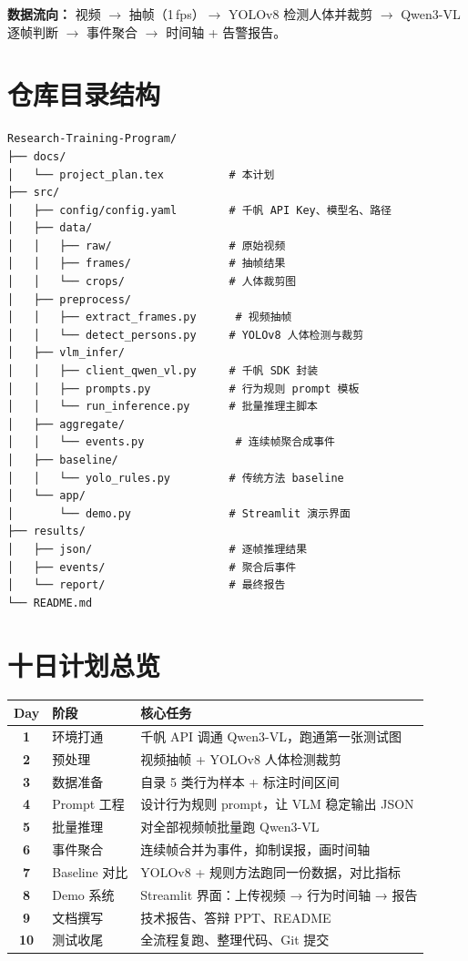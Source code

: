 \documentclass[12pt,a4paper]{ctexart}
\begin{document}
\textbf{数据流向：}
视频 $\rightarrow$ 抽帧（1\,fps）$\rightarrow$ YOLOv8 检测人体并裁剪
$\rightarrow$ Qwen3-VL 逐帧判断 $\rightarrow$ 事件聚合 $\rightarrow$ 时间轴 + 告警报告。

\section{仓库目录结构}

\begin{lstlisting}
Research-Training-Program/
├── docs/
│   └── project_plan.tex          # 本计划
├── src/
│   ├── config/config.yaml        # 千帆 API Key、模型名、路径
│   ├── data/
│   │   ├── raw/                  # 原始视频
│   │   ├── frames/               # 抽帧结果
│   │   └── crops/                # 人体裁剪图
│   ├── preprocess/
│   │   ├── extract_frames.py      # 视频抽帧
│   │   └── detect_persons.py     # YOLOv8 人体检测与裁剪
│   ├── vlm_infer/
│   │   ├── client_qwen_vl.py     # 千帆 SDK 封装
│   │   ├── prompts.py            # 行为规则 prompt 模板
│   │   └── run_inference.py      # 批量推理主脚本
│   ├── aggregate/
│   │   └── events.py              # 连续帧聚合成事件
│   ├── baseline/
│   │   └── yolo_rules.py         # 传统方法 baseline
│   └── app/
│       └── demo.py               # Streamlit 演示界面
├── results/
│   ├── json/                     # 逐帧推理结果
│   ├── events/                   # 聚合后事件
│   └── report/                   # 最终报告
└── README.md
\end{lstlisting}

\section{十日计划总览}

\begin{table}[h]
\centering
\small
\begin{tabular}{>{\bfseries}c p{3.2cm} p{7.8cm}}
\toprule
Day & 阶段 & 核心任务 \\
\midrule
1 & 环境打通 & 千帆 API 调通 Qwen3-VL，跑通第一张测试图 \\
2 & 预处理 & 视频抽帧 + YOLOv8 人体检测裁剪 \\
3 & 数据准备 & 自录 5 类行为样本 + 标注时间区间 \\
4 & Prompt 工程 & 设计行为规则 prompt，让 VLM 稳定输出 JSON \\
5 & 批量推理 & 对全部视频帧批量跑 Qwen3-VL \\
6 & 事件聚合 & 连续帧合并为事件，抑制误报，画时间轴 \\
7 & Baseline 对比 & YOLOv8 + 规则方法跑同一份数据，对比指标 \\
8 & Demo 系统 & Streamlit 界面：上传视频 → 行为时间轴 → 报告 \\
9 & 文档撰写 & 技术报告、答辩 PPT、README \\
10 & 测试收尾 & 全流程复跑、整理代码、Git 提交 \\
\bottomrule
\end{tabular}
\end{table}
\end{document}
